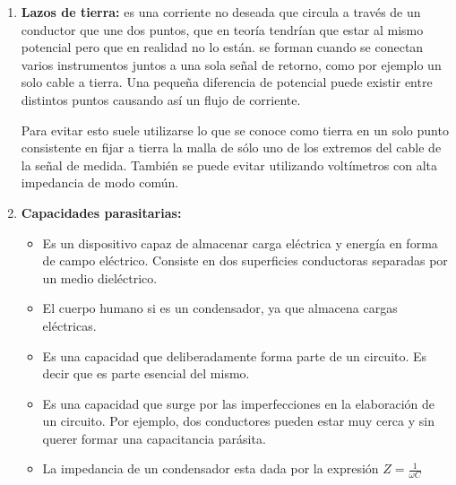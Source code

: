 \begin{enumerate}
    
    \item %
    \textbf{Lazos de tierra:}
    es una corriente no deseada que circula a través de un conductor que une dos puntos, que en teoría tendrían que estar al mismo potencial pero que en realidad no lo están. se forman cuando se conectan varios instrumentos juntos a una sola señal de retorno, como por ejemplo un solo cable a tierra. Una pequeña diferencia de potencial puede existir entre distintos puntos causando así un flujo de corriente.
    
    Para evitar esto suele utilizarse lo que se conoce como tierra en un solo punto consistente en fijar a tierra la malla de sólo uno de los extremos del cable de la señal de medida. También se puede evitar utilizando voltímetros con alta impedancia de modo común.
    
    \item %
    \textbf{Capacidades parasitarias:}
    \begin{itemize}
        \item Es un dispositivo capaz de almacenar carga eléctrica y energía en forma de campo eléctrico. Consiste en dos superficies conductoras separadas por un medio dieléctrico.
        \item El cuerpo humano si es un condensador, ya que almacena cargas eléctricas.
        \item Es una capacidad que deliberadamente forma parte de un circuito. Es decir que es parte esencial del mismo.
        \item Es una capacidad que surge por las imperfecciones en la elaboración de un circuito. Por ejemplo, dos conductores pueden estar muy cerca y sin querer formar una capacitancia parásita.
        \item La impedancia de un condensador esta dada por la expresión $Z=\frac{1}{\omega C}$
    \end{itemize}
\end{enumerate}